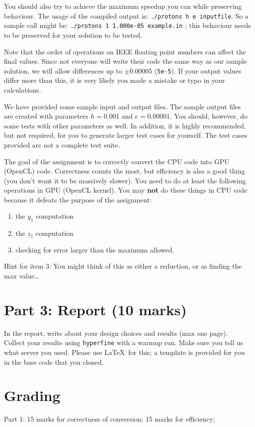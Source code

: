 \documentclass[letterpaper,10pt]{article}
\begin{document}
You should also try to achieve the maximum speedup you can while preserving behaviour. The usage of the compiled output is: \texttt{./protons h e inputfile}. So a sample call might be: \texttt{./protons 1 1.000e-05 example.in} ; this behaviour needs to be preserved for your solution to be tested.

Note that the order of operations on IEEE floating point numbers can affect the final values. Since not everyone will write their code the same way as our sample solution, we will allow differences up to $\pm 0.00005$ (\texttt{5e-5}). If your output values differ more than this, it is very likely you made a mistake or typo in your calculations.

We have provided some sample input and output files. The sample output files are created with parameters $h=0.001$ and $e=0.00001$. You should, however, do some tests with other parameters as well. In addition, it is highly recommended, but not required, for you to generate larger test cases for yourself. The test cases provided are not a complete test suite.

The goal of the assignment is to correctly convert the CPU code into GPU (OpenCL) code. Correctness counts the most, but efficiency is also a good thing (you don't want it to be massively slower).  You need to do at least the following operations in GPU (OpenCL kernel). You may \textbf{ not } do these things in CPU code because it defeats the purpose of the assignment: 

\begin{enumerate}
\item the $y_{1}$ computation
\item the $z_{1}$ computation
\item checking for error larger than the maximum allowed.
\end{enumerate} 

Hint for item 3:  You might think of this as either a reduction, or as finding the max value\ldots

\section*{Part 3: Report (10 marks)}
In the report, write about your design choices and results (max one page). 
Collect your results using \texttt{hyperfine} with a warmup run. Make sure you tell us what server you used. Please use \LaTeX~for this; a template is provided for you in the base code that you cloned. 

\section*{Grading}
Part 1: 15 marks for correctness of conversion; 15 marks for efficiency; 
\end{document}
